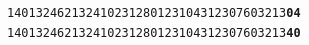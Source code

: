 \texttt{140132462132410231280123104312307603213\textcolor{accent}{\textbf{0}}\textcolor{accent}{\textbf{4}}}\\
\texttt{140132462132410231280123104312307603213\textcolor{accent}{\textbf{4}}\textcolor{accent}{\textbf{0}}}
